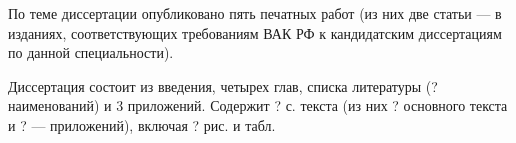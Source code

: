  По теме диссертации опубликовано пять печатных работ (из них две статьи --- в изданиях, соответствующих требованиям ВАК РФ к кандидатским диссертациям по данной специальности).

 Диссертация состоит из введения, четырех глав, списка литературы (? наименований) и 3 приложений. Содержит ? с. текста (из них ? основного текста и ? --- приложений), включая ? рис. и табл.

